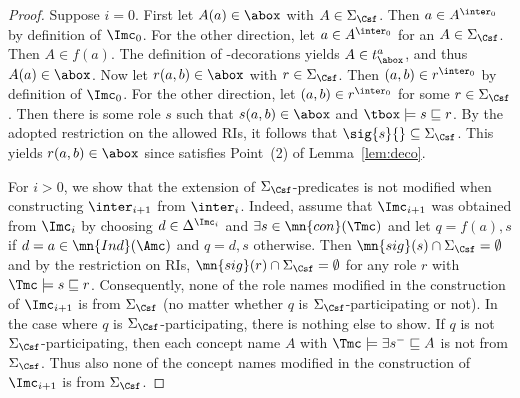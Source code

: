 \documentclass{lmcs}
\theoremstyle{definition}
\begin{document}
\begin{proof}
    Suppose $i=0$. First let $A(a)\in\abox$ with $A\in\Sigma_{\Csf}$. Then
    $a\in A^{\inter_0}$ by definition of $\Imc_0$. For the other
    direction, let $a\in A^{\inter_0}$ for an $A\in\Sigma_{\Csf}$. Then $A\in
    f(a)$. The definition of \Tmc-decorations yields $A\in t^a_\abox$,
    and thus $A(a)\in\abox$. Now let $r(a,b)\in\abox$ with
    $r\in\Sigma_{\Csf}$. Then $(a,b)\in r^{\inter_0}$ by definition of
    $\Imc_0$. For the other direction, let $(a,b)\in r^{\inter_0}$ for
    some $r\in\Sigma_{\Csf}$. Then there is some role $s$ such that
    $s(a,b)\in\abox$ and $\tbox\models s\sqsubseteq r$. By the adopted
    restriction on the allowed RIs, it follows that
    $\sig{s}{}\subseteq\Sigma_{\Csf}$. This yields $r(a,b)\in\abox$ since
    \Amc satisfies Point~(2) of Lemma~\ref{lem:deco}.

    For $i > 0$, we show that the extension of $\Sigma_{\Csf}$-predicates is
    not modified when constructing $\inter_{i+1}$ from
    $\inter_i$. Indeed, assume that $\Imc_{i+1}$ was obtained from
    $\Imc_i$ by choosing $d \in \Delta^{\Imc_i}$ and $\exists s \in
    \mn{con}(\Tmc)$ and let $q=f(a),s$ if $d=a \in \mn{Ind}(\Amc)$ and
    $q=d,s$ otherwise. Then $\mn{sig}(s) \cap \Sigma_{\Csf} = \emptyset$ and
    by the restriction on RIs, $\mn{sig}(r) \cap \Sigma_{\Csf} =
    \emptyset$ for any role $r$ with $\Tmc \models s \sqsubseteq
    r$. Consequently, none of the role names modified in the
    construction of $\Imc_{i+1}$ is from $\Sigma_{\Csf}$ (no matter whether
    $q$ is $\Sigma_{\Csf}$-participating or not).  In the case where $q$ is
    $\Sigma_{\Csf}$-participating, there is nothing else to show. If $q$ is
    not $\Sigma_{\Csf}$-participating, then each concept name $A$ with $\Tmc
    \models \exists s^- \sqsubseteq A$ is not from $\Sigma_{\Csf}$. Thus also
    none of the concept names modified in the construction of
    $\Imc_{i+1}$ is from $\Sigma_{\Csf}$.
  \end{proof}
\end{document}
